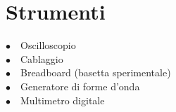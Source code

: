 

\section{Strumenti}

$\bullet \quad$Oscilloscopio \\
$\bullet \quad$Cablaggio\\
$\bullet \quad$Breadboard (basetta sperimentale)\\
$\bullet \quad$Generatore di forme d'onda\\
$\bullet \quad$Multimetro digitale\\